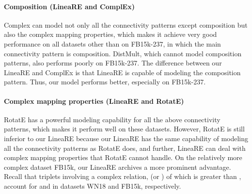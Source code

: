 \documentclass[conference]{IEEEtran}
\begin{document}
\paragraph{Composition (LineaRE and ComplEx)}
Complex can model not only all the connectivity patterns except composition but also the complex mapping properties, which makes it achieve very good performance on all datasets other than on FB15k-237, in which the main connectivity pattern is composition. DistMult, which cannot model composition patterns, also performs poorly on FB15k-237. The difference between our LineaRE and ComplEx is that LineaRE is capable of modeling the composition pattern. Thus, our model performs better, especially on FB15k-237.

\paragraph{Complex mapping properties (LineaRE and RotatE)}
RotatE has a powerful modeling capability for all the above connectivity patterns, which makes it perform well on these datasets. However, RotatE is still inferior to our LineaRE because our LineaRE has the same capability of modeling all the connectivity patterns as RotatE does, and further, LineaRE can deal with complex mapping properties that RotatE cannot handle. On the relatively more complex dataset FB15k, our LineaRE archives a more prominent advantage. Recall that triplets involving a complex relation,  (or ) of which is greater than , account for  and  in datasets WN18 and FB15k, respectively.
\end{document}
